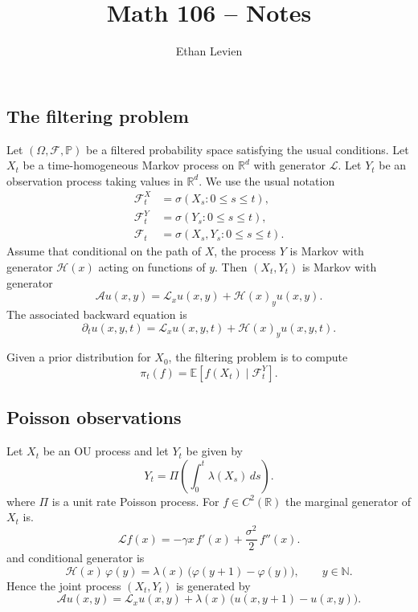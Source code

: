 \documentclass[11pt]{article}
\title{Math 106 -- Notes }
\author{Ethan Levien}
\date{}
\begin{document}
\maketitle


\subsection*{The filtering problem}

Let $(\Omega,\mathcal F,\mathbb P)$ be a filtered probability space satisfying the usual conditions.  
Let $X_t$ be a time-homogeneous Markov process on $\mathbb R^d$ with generator $\mathcal L$.  
Let $Y_t$ be an observation process taking values in $\mathbb R^d$. We use the usual notation 
\begin{align}
\mathcal F_t^X &= \sigma(X_s:0\le s\le t), \\
\mathcal F_t^Y &= \sigma(Y_s:0\le s\le t), \\
\mathcal F_t &= \sigma(X_s,Y_s:0\le s\le t).
\end{align}
Assume that conditional on the path of $X$, the process $Y$ is Markov with generator $\mathcal H(x)$ acting on functions of $y$.  
Then $(X_t,Y_t)$ is Markov with generator
\begin{equation}
\mathcal A u(x,y)
=
\mathcal L_x u(x,y)
+
\mathcal H(x)_y u(x,y).
\end{equation}
The associated backward equation is
\begin{equation}
\partial_t u(x,y,t)
=
\mathcal L_x u(x,y,t)
+
\mathcal H(x)_y u(x,y,t).
\end{equation}

Given a prior distribution for $X_0$, the filtering problem is to compute
\begin{equation}
\pi_t(f)
=
\mathbb E\!\left[f(X_t)\mid \mathcal F_t^Y\right].
\end{equation}

\subsection*{Poisson observations}

Let $X_t$ be an OU process and let $Y_t$ be given by 
\begin{equation}
Y_t = \Pi\!\left(\int_0^t \lambda(X_s)\,ds\right).
\end{equation}
where $\Pi$ is a unit rate Poisson process. 
For $f\in C^2(\mathbb R)$ the marginal generator of $X_t$ is. 
\begin{equation}
\mathcal L f(x)
=
-\gamma x\, f'(x)
+
\frac{\sigma^2}{2}\, f''(x).
\end{equation}
and conditional generator is
\begin{equation}
\mathcal H(x)\,\varphi(y)
=
\lambda(x)\,\big(\varphi(y+1)-\varphi(y)\big),
\qquad y\in\mathbb N.
\end{equation}
Hence the joint process $(X_t,Y_t)$ is generated by 
\begin{equation}
\mathcal A u(x,y)
=
\mathcal L_x u(x,y)
+
\lambda(x)\,\big(u(x,y+1)-u(x,y)\big).
\end{equation}
\end{document}
